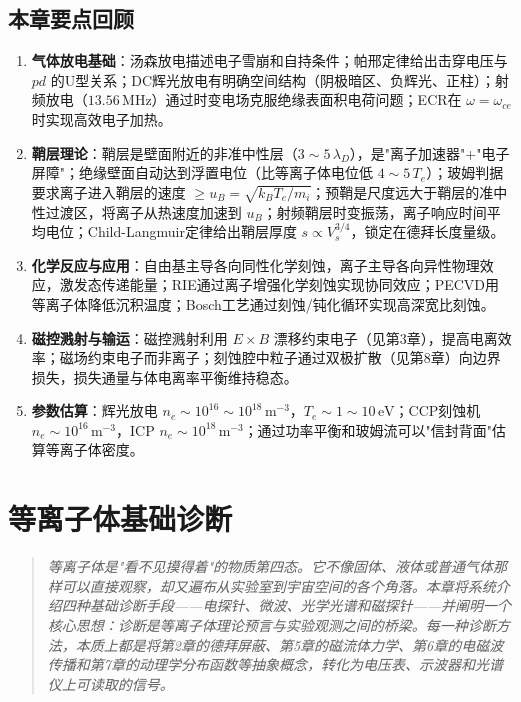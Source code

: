 \documentclass[12pt,a4paper,openany,oneside]{book}
\begin{document}
\section{本章要点回顾}

\begin{chapterreview}
\begin{enumerate}
\item \textbf{气体放电基础}：汤森放电描述电子雪崩和自持条件；帕邢定律给出击穿电压与 $pd$ 的U型关系；DC辉光放电有明确空间结构（阴极暗区、负辉光、正柱）；射频放电（$13.56\,\mathrm{MHz}$）通过时变电场克服绝缘表面积电荷问题；ECR在 $\omega = \omega_{ce}$ 时实现高效电子加热。

\item \textbf{鞘层理论}：鞘层是壁面附近的非准中性层（$3\sim 5\,\lambda_D$），是"离子加速器"+"电子屏障"；绝缘壁面自动达到浮置电位（比等离子体电位低 $4\sim 5\,T_e$）；玻姆判据要求离子进入鞘层的速度 $\ge u_B = \sqrt{k_B T_e/m_i}$；预鞘是尺度远大于鞘层的准中性过渡区，将离子从热速度加速到 $u_B$；射频鞘层时变振荡，离子响应时间平均电位；Child-Langmuir定律给出鞘层厚度 $s \propto V_s^{3/4}$，锁定在德拜长度量级。

\item \textbf{化学反应与应用}：自由基主导各向同性化学刻蚀，离子主导各向异性物理效应，激发态传递能量；RIE通过离子增强化学刻蚀实现协同效应；PECVD用等离子体降低沉积温度；Bosch工艺通过刻蚀/钝化循环实现高深宽比刻蚀。

\item \textbf{磁控溅射与输运}：磁控溅射利用 $E\times B$ 漂移约束电子（见第3章），提高电离效率；磁场约束电子而非离子；刻蚀腔中粒子通过双极扩散（见第8章）向边界损失，损失通量与体电离率平衡维持稳态。

\item \textbf{参数估算}：辉光放电 $n_e \sim 10^{16}\sim 10^{18}\,\mathrm{m^{-3}}$，$T_e \sim 1\sim 10\,\mathrm{eV}$；CCP刻蚀机 $n_e \sim 10^{16}\,\mathrm{m^{-3}}$，ICP $n_e \sim 10^{18}\,\mathrm{m^{-3}}$；通过功率平衡和玻姆流可以"信封背面"估算等离子体密度。
\end{enumerate}
\end{chapterreview}

\newpage

\chapter{等离子体基础诊断}\label{ch:12}

\begin{quotation}
\itshape\small
等离子体是"看不见摸得着"的物质第四态。它不像固体、液体或普通气体那样可以直接观察，却又遍布从实验室到宇宙空间的各个角落。本章将系统介绍四种基础诊断手段——电探针、微波、光学光谱和磁探针——并阐明一个核心思想：\emph{诊断是等离子体理论预言与实验观测之间的桥梁}。每一种诊断方法，本质上都是将第2章的德拜屏蔽、第5章的磁流体力学、第6章的电磁波传播和第7章的动理学分布函数等抽象概念，转化为电压表、示波器和光谱仪上可读取的信号。
\end{quotation}
\end{document}
